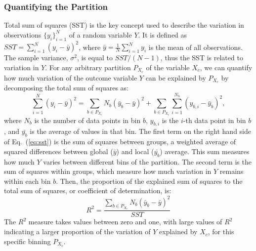 \documentclass[letterpaper]{article} %
\begin{document}
\subsubsection{Quantifying the Partition}
Total sum of squares (SST) is the key concept used to describe the variation in observations $\{ y_i \}^{N}_{i = 1}$ of a random variable $Y$. It is defined as $SST = \sum_{i=1}^N (y_i - \bar{y})^2$, where $\bar{y} = \frac{1}{N} \sum_{i=1}^N y_i$ is the mean of all observations. The sample variance, $\sigma^2$, is equal to $SST / (N - 1)$, thus the SST is related to variation in $Y$.
For any arbitrary partition $P_{X_c}$ of the variable $X_c$, we can quantify how much variation of the outcome variable $Y$ can be explained by $P_{X_c}$ by decomposing the total sum of squares as:
\begin{equation}
\sum_{i=1}^N (y_i - \bar{y})^2 = \sum_{b \in P_{X_c}} N_b(\bar{y}_b - \bar{y})^2 + \sum_{b \in P_{X_c}} \sum_{i = 1}^{N_b} (y_{b, i} - \bar{y}_b)^2,
\label{eq:sst}
\end{equation}
where $N_b$ is the number of data points in bin $b$, $y_{b, i}$ is the $i$-th data point in bin $b$, and $\bar{y_b}$ is the average of values in that bin. The first term on the right hand side of Eq.~(\ref{eq:sst}) is the sum of squares between groups, a weighted average of squared differences between global ($\bar{y}$) and local ($\bar{y_b}$) average. This sum measures how much $Y$ varies between different bins of the partition. The second term is the sum of squares within groups, which measure how much variation in $Y$ remains within each bin $b$. Then, the proportion of the explained sum of squares to the total sum of squares, or coefficient of determination, is:
\begin{equation}
R^2 = \frac{\sum_{b \in P_{X_c}} N_b(\bar{y}_b - \bar{y})^2}{SST}
\label{eq:r_2}
\end{equation}
The $R^2$ measure takes values between zero and one, with large values of $R^2$ indicating a larger proportion of the variation of $Y$ explained by $X_c$, for this specific binning $P_{X_c}$.
\end{document}
